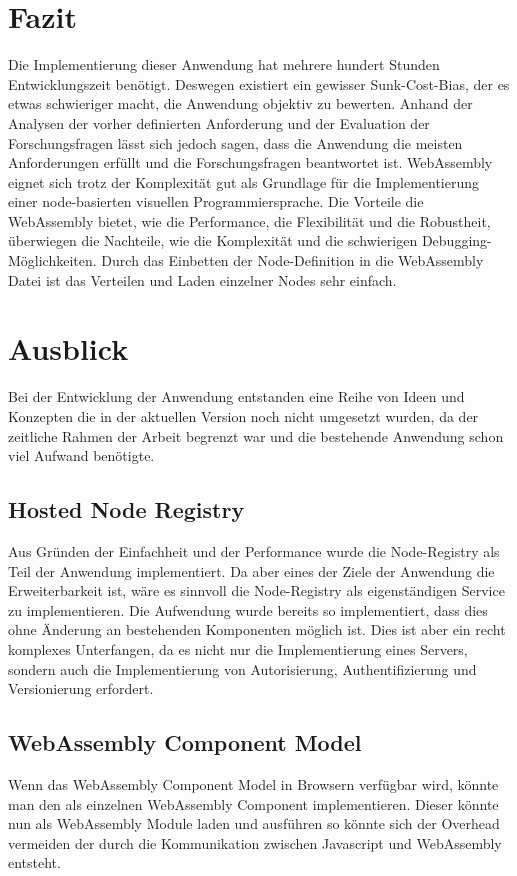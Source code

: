 \documentclass[ngerman]{article}
\begin{document}
\section{Fazit}
Die Implementierung dieser Anwendung hat mehrere hundert Stunden Entwicklungszeit benötigt. Deswegen existiert ein gewisser Sunk-Cost-Bias, der es etwas schwieriger macht, die Anwendung objektiv zu bewerten. 
Anhand der Analysen der vorher definierten Anforderung und der Evaluation der Forschungsfragen lässt sich jedoch sagen, dass die Anwendung die meisten Anforderungen erfüllt und die Forschungsfragen beantwortet ist.
\br
WebAssembly eignet sich trotz der Komplexität gut als Grundlage für die Implementierung einer node-basierten visuellen Programmiersprache. Die Vorteile die WebAssembly bietet, wie die Performance, die Flexibilität und die Robustheit, überwiegen die Nachteile, wie die Komplexität und die schwierigen Debugging-Möglichkeiten. Durch das Einbetten der Node-Definition in die WebAssembly Datei ist das Verteilen und Laden einzelner Nodes sehr einfach.



\section{Ausblick}
Bei der Entwicklung der Anwendung entstanden eine Reihe von Ideen und Konzepten die in der aktuellen Version noch nicht umgesetzt wurden, da 
der zeitliche Rahmen der Arbeit begrenzt war und die bestehende Anwendung schon viel Aufwand benötigte.

\subsection*{Hosted Node Registry}
Aus Gründen der Einfachheit und der Performance wurde die Node-Registry als Teil der Anwendung implementiert. Da aber eines der Ziele der Anwendung die Erweiterbarkeit ist, wäre es sinnvoll die Node-Registry als eigenständigen Service zu implementieren. Die Aufwendung wurde bereits so implementiert, dass dies ohne Änderung an bestehenden Komponenten möglich ist.
\br
Dies ist aber ein recht komplexes Unterfangen, da es nicht nur die Implementierung eines Servers, sondern auch die Implementierung von Autorisierung, Authentifizierung und Versionierung erfordert.

\subsection*{WebAssembly Component Model}
Wenn das WebAssembly Component Model in Browsern verfügbar wird, könnte man den  als einzelnen WebAssembly Component implementieren. Dieser könnte nun  als WebAssembly Module laden und ausführen so könnte sich der Overhead vermeiden der durch die Kommunikation zwischen Javascript und WebAssembly entsteht.
\end{document}
